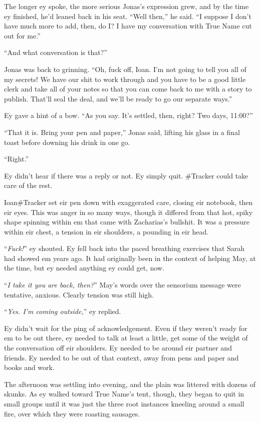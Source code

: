 The longer ey spoke, the more serious Jonas's expression grew, and by the time ey finished, he'd leaned back in his seat. ``Well then,'' he said. ``I suppose I don't have much more to add, then, do I? I have my conversation with True Name cut out for me.''

``And what conversation is that?''

Jonas was back to grinning. ``Oh, fuck off, Ioan. I'm not going to tell you all of my secrets! We have our shit to work through and you have to be a good little clerk and take all of your notes so that you can come back to me with a story to publish. That'll seal the deal, and we'll be ready to go our separate ways.''

Ey gave a hint of a bow. ``As you say. It's settled, then, right? Two days, 11:00?''

``That it is. Bring your pen and paper,'' Jonas said, lifting his glass in a final toast before downing his drink in one go.

``Right.''

Ey didn't hear if there was a reply or not. Ey simply quit. \#Tracker could take care of the rest.

Ioan\#Tracker set eir pen down with exaggerated care, closing eir notebook, then eir eyes. This was anger in so many ways, though it differed from that hot, spiky shape spinning within em that came with Zacharias's bullshit. It was a pressure within eir chest, a tension in eir shoulders, a pounding in eir head.

``\emph{Fuck!}'' ey shouted. Ey fell back into the paced breathing exercises that Sarah had showed em years ago. It had originally been in the context of helping May, at the time, but ey needed anything ey could get, now.

``\emph{I take it you are back, then?}'' May's words over the sensorium message were tentative, anxious. Clearly tension was still high.

``\emph{Yes. I'm coming outside,}'' ey replied.

Ey didn't wait for the ping of acknowledgement. Even if they weren't ready for em to be out there, ey needed to talk at least a little, get some of the weight of the conversation off eir shoulders. Ey needed to be around eir partner and friends. Ey needed to be out of that context, away from pens and paper and books and work.

The afternoon was settling into evening, and the plain was littered with dozens of skunks. As ey walked toward True Name's tent, though, they began to quit in small groups until it was just the three root instances kneeling around a small fire, over which they were roasting sausages.

